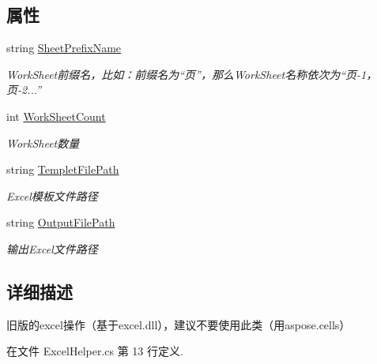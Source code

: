 \subsection*{属性}
\begin{DoxyCompactItemize}
\item 
string \hyperlink{class_x_c_l_net_tools_1_1_data_handler_1_1_excel_helper_a19d5234b9309942b87041f70bef91647}{Sheet\-Prefix\-Name}
\begin{DoxyCompactList}\small\item\em Work\-Sheet前缀名，比如：前缀名为“页”，那么\-Work\-Sheet名称依次为“页-\/1，页-\/2...” \end{DoxyCompactList}\item 
int \hyperlink{class_x_c_l_net_tools_1_1_data_handler_1_1_excel_helper_ab8d2677869ff64e25bbe54623ef9fa86}{Work\-Sheet\-Count}
\begin{DoxyCompactList}\small\item\em Work\-Sheet数量 \end{DoxyCompactList}\item 
string \hyperlink{class_x_c_l_net_tools_1_1_data_handler_1_1_excel_helper_a0e4501c60ef6446d0fe8151a6e58fca4}{Templet\-File\-Path}
\begin{DoxyCompactList}\small\item\em Excel模板文件路径 \end{DoxyCompactList}\item 
string \hyperlink{class_x_c_l_net_tools_1_1_data_handler_1_1_excel_helper_ada3dfa77cf3ac278ee83281f04707aa3}{Output\-File\-Path}
\begin{DoxyCompactList}\small\item\em 输出\-Excel文件路径 \end{DoxyCompactList}\end{DoxyCompactItemize}


\subsection{详细描述}
旧版的excel操作（基于excel.\-dll），建议不要使用此类（用aspose.\-cells） 



在文件 Excel\-Helper.\-cs 第 13 行定义.



